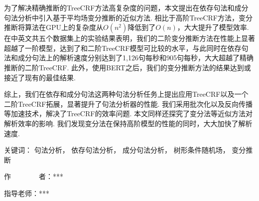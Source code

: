 \begin{cabstract}
\begin{enumerate}
		      为了解决精确推断的TreeCRF方法高复杂度的问题，本文提出在依存句法和成分句法分析中引入基于平均场变分推断的近似方法.
		      相比于高阶TreeCRF方法，变分推断将算法在GPU上的复杂度从$O(n^2)$降低到了$O(n)$，大大提升了模型效率.
		      在中英文共五个数据集上的实验结果表明，我们的二阶变分推断方法在性能上显著超越了一阶模型，达到了和二阶TreeCRF模型可比较的水平，与此同时在依存句法和成分句法上的解析速度分别达到了1,126句每秒和905句每秒，大大超越了精确推断的二阶TreeCRF.
		      此外，使用BERT之后，我们的变分推断方法的结果达到或接近了现有的最佳结果.
		      
	\end{enumerate}
	
	综上，我们在依存和成分句法这两种句法分析任务上提出应用TreeCRF以及一个二阶TreeCRF拓展，显著提升了句法分析器的性能.
	我们采用批次化以及反向传播等加速技术，解决了TreeCRF的效率问题.
	本文同样还探究了变分法等近似方法对解析效率的影响.
	我们发现变分法在保持高阶模型的性能的同时，大大加快了解析速度.
	
	\vskip 21bp
	{\heiti{} 关键词：}
	句法分析，
	依存句法分析，
	成分句法分析，
	树形条件随机场，
	变分推断
	
	\begin{flushright}
		作~~~~~~~~者：***
		
		指导老师：***
		
	\end{flushright}
\end{cabstract}


